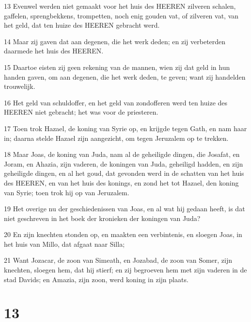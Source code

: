 \par 13 Evenwel werden niet gemaakt voor het huis des HEEREN zilveren schalen, gaffelen, sprengbekkens, trompetten, noch enig gouden vat, of zilveren vat, van het geld, dat ten huize des HEEREN gebracht werd.
\par 14 Maar zij gaven dat aan degenen, die het werk deden; en zij verbeterden daarmede het huis des HEEREN.
\par 15 Daartoe eisten zij geen rekening van de mannen, wien zij dat geld in hun handen gaven, om aan degenen, die het werk deden, te geven; want zij handelden trouwelijk.
\par 16 Het geld van schuldoffer, en het geld van zondofferen werd ten huize des HEEREN niet gebracht; het was voor de priesteren.
\par 17 Toen trok Hazael, de koning van Syrie op, en krijgde tegen Gath, en nam haar in; daarna stelde Hazael zijn aangezicht, om tegen Jeruzalem op te trekken.
\par 18 Maar Joas, de koning van Juda, nam al de geheiligde dingen, die Josafat, en Joram, en Ahazia, zijn vaderen, de koningen van Juda, geheiligd hadden, en zijn geheiligde dingen, en al het goud, dat gevonden werd in de schatten van het huis des HEEREN, en van het huis des konings, en zond het tot Hazael, den koning van Syrie; toen trok hij op van Jeruzalem.
\par 19 Het overige nu der geschiedenissen van Joas, en al wat hij gedaan heeft, is dat niet geschreven in het boek der kronieken der koningen van Juda?
\par 20 En zijn knechten stonden op, en maakten een verbintenis, en sloegen Joas, in het huis van Millo, dat afgaat naar Silla;
\par 21 Want Jozacar, de zoon van Simeath, en Jozabad, de zoon van Somer, zijn knechten, sloegen hem, dat hij stierf; en zij begroeven hem met zijn vaderen in de stad Davids; en Amazia, zijn zoon, werd koning in zijn plaats.

\chapter{13}

